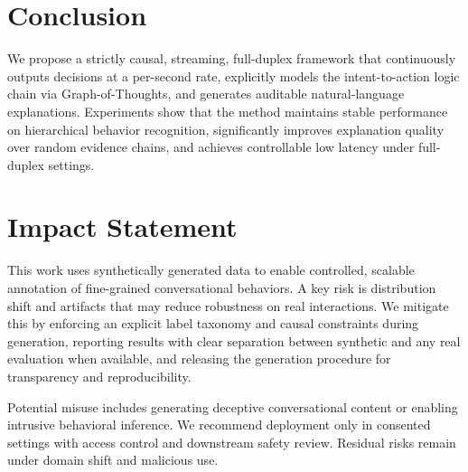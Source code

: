 \section{Conclusion}
We propose a strictly causal, streaming, full-duplex framework that continuously outputs decisions at a per-second rate, explicitly models the intent-to-action logic chain via Graph-of-Thoughts, and generates auditable natural-language explanations. Experiments show that the method maintains stable performance on hierarchical behavior recognition, significantly improves explanation quality over random evidence chains, and achieves controllable low latency under full-duplex settings.

\section*{Impact Statement}
This work uses synthetically generated data to enable controlled, scalable annotation of fine-grained conversational behaviors. A key risk is distribution shift and artifacts that may reduce robustness on real interactions. We mitigate this by enforcing an explicit label taxonomy and causal constraints during generation, reporting results with clear separation between synthetic and any real evaluation when available, and releasing the generation procedure for transparency and reproducibility.

Potential misuse includes generating deceptive conversational content or enabling intrusive behavioral inference. We recommend deployment only in consented settings with access control and downstream safety review. Residual risks remain under domain shift and malicious use.
